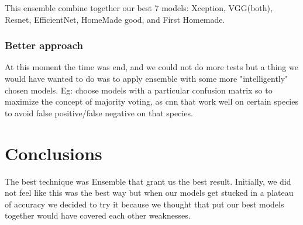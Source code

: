 \documentclass[11pt]{article}
\begin{document}
This ensemble combine together our best 7 models: Xception, VGG(both), Resnet, EfficientNet, HomeMade good, and First Homemade.

\subsubsection{Better approach}
At this moment the time was end, and we could not do more tests but a thing we would have wanted to do was to apply ensemble with some more "intelligently" chosen models.
Eg: choose models with a particular confusion matrix so to maximize the concept of majority voting, as cnn that work well on certain species to avoid false positive/false negative on that species.

\section{Conclusions}
The best technique was Ensemble that grant us the best result.
Initially, we did not feel like this was the best way but when our models get stucked in a plateau of accuracy
we decided to try it because we thought that put our best models together would have covered each other weaknesses.

\end{document}
